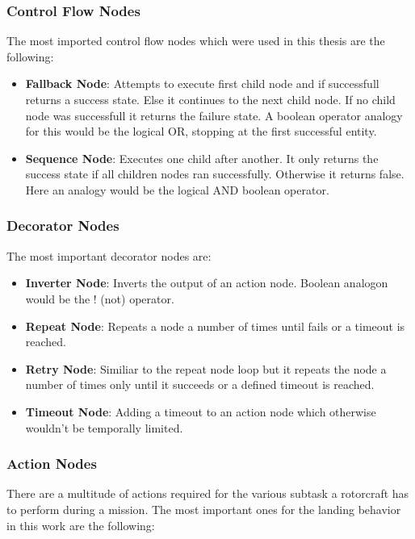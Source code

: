 \subsubsection{Control Flow Nodes}

The most imported control flow nodes which were used in this thesis are the following:

\begin{itemize}
    \item \textbf{Fallback Node}: Attempts to execute first child node and if successfull returns a success state. Else it continues to the next child node. If no child node was successfull it returns the failure state. A boolean operator analogy for this would be the logical OR, stopping at the first successful entity.
    \item \textbf{Sequence Node}: Executes one child after another. It only returns the success state if all children nodes ran successfully. Otherwise it returns false. Here an analogy would be the logical AND boolean operator.
\end{itemize}

\subsubsection{Decorator Nodes}

The most important decorator nodes are:

\begin{itemize}
    \item \textbf{Inverter Node}: Inverts the output of an action node. Boolean analogon would be the ! (not) operator.
    \item \textbf{Repeat Node}: Repeats a node a number of times until fails or a timeout is reached. 
    \item \textbf{Retry Node}: Similiar to the repeat node loop but it repeats the node a number of times only until it succeeds or a defined timeout is reached.
    \item \textbf{Timeout Node}: Adding a timeout to an action node which otherwise wouldn't be temporally limited.
\end{itemize}

\subsubsection{Action Nodes}\label{subsubsec:setup:action_nodes}

There are a multitude of actions required for the various subtask a rotorcraft has to perform during a mission. The most important ones for the landing behavior in this work are the following:

